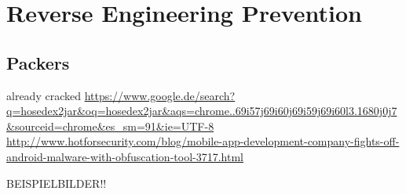 \section{Reverse Engineering Prevention} \label{section:evaluation-reengineering}







\subsection{Packers}
already cracked \url{https://www.google.de/search?q=hosedex2jar&oq=hosedex2jar&aqs=chrome..69i57j69i60j69i59j69i60l3.1680j0j7&sourceid=chrome&es_sm=91&ie=UTF-8}\newline
\url{http://www.hotforsecurity.com/blog/mobile-app-development-company-fights-off-android-malware-with-obfuscation-tool-3717.html}\newline

BEISPIELBILDER!!
